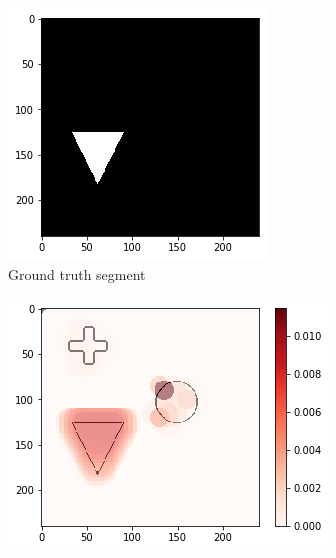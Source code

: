 \begin{figure}[H]
    \centering
    \begin{subfigure}[t]{.28\textwidth}
        \centering
        \includegraphics[width=\linewidth]{chapters/06_hdm/testnet/8.png}
        \caption{Ground truth segment}
    \end{subfigure}\hfill%
    \begin{subfigure}[t]{.34\textwidth}
        \centering
        \includegraphics[width=\linewidth]{chapters/06_hdm/testnet/10.png}

\end{subfigure}
\end{figure}
